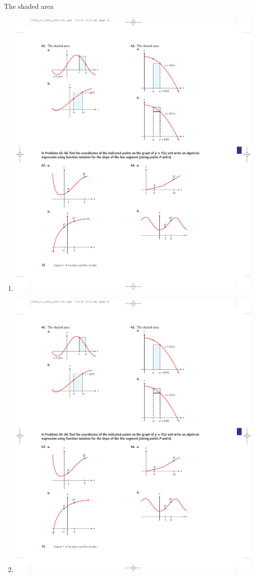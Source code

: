 \documentclass[10pt,]{book}
\theoremstyle{plain}
\theoremstyle{definition}
\theoremstyle{definition}
\theoremstyle{definition}
\theoremstyle{definition}
\numberwithin{equation}{part}
\begin{document}
\begin{exercisegroup}
\begin{multicols}{2}
\begin{enumerate}[label=*\alph**]
%
\end{enumerate}
\end{multicols}
%
\exercise[61.]\hypertarget{exercise-276}{}The shaded area \leavevmode%
\begin{multicols}{2}
\begin{enumerate}[label=*\alph**]
\item\hypertarget{li-1084}{}\includegraphics[width=0.8\linewidth]{images/fig-ex-1-4-61a}
%
\item\hypertarget{li-1085}{}\includegraphics[width=0.8\linewidth]{images/fig-ex-1-4-61b}

\end{enumerate}
\end{multicols}
\end{exercisegroup}
\end{document}
